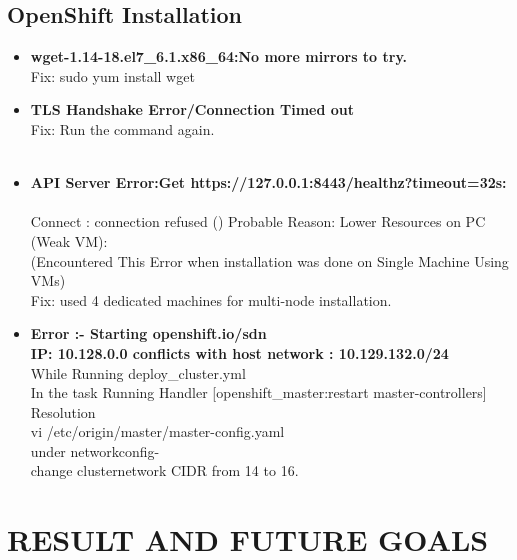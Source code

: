 \documentclass[11pt]{report}
\begin{document}
	\section{OpenShift Installation}
	\begin{itemize}
		\item \textbf{wget-1.14-18.el7\_6.1.x86\_64:No more mirrors to try.} \ \\
		Fix: sudo yum install wget \ \\
		\item \textbf{TLS Handshake Error/Connection Timed out} \ \\
		Fix: Run the command again. \ \\
		\ \\
		\item  \textbf{API Server Error:Get https://127.0.0.1:8443/healthz?timeout=32s:} \ \\
		Connect : connection refused ()
		Probable Reason:
		Lower Resources on PC (Weak VM): \ \\
		(Encountered This Error when installation was done on Single Machine Using VMs)
		\ \\
		Fix: used 4 dedicated machines for multi-node installation.
		\item \textbf{Error :- Starting openshift.io/sdn \ \\
			IP: 10.128.0.0 conflicts with host network : 10.129.132.0/24
		}
		\ \\
		While Running deploy\_cluster.yml \ \\
		In the task Running Handler [openshift\_master:restart master-controllers] \ \\
		Resolution \ \\  vi /etc/origin/master/master-config.yaml \ \\ 
		under networkconfig- \ \\
		change clusternetwork CIDR from 14 to 16. \ \\ 
		
		
	\end{itemize}
	
	\chapter{RESULT AND FUTURE GOALS}
\end{document}
